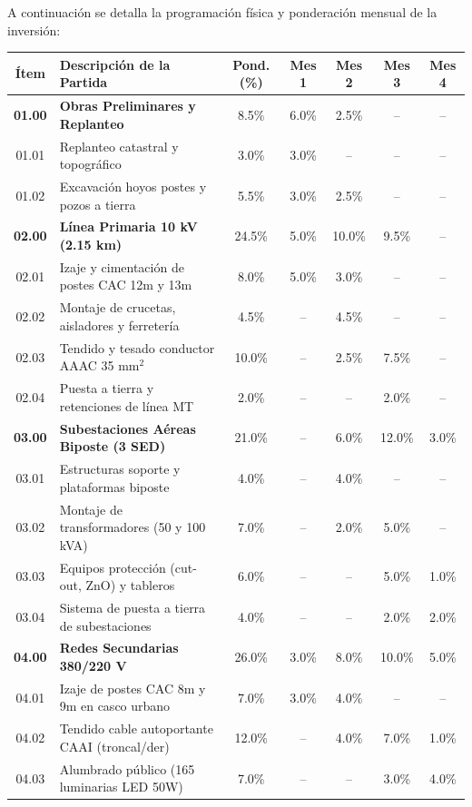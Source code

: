 A continuación se detalla la programación física y ponderación mensual de la inversión:

\begin{table}[H]
\centering
\small
\begin{tabular}{|c|l|c|c|c|c|c|}
\hline
\textbf{Ítem} & \textbf{Descripción de la Partida} & \textbf{Pond. (\%)} & \textbf{Mes 1} & \textbf{Mes 2} & \textbf{Mes 3} & \textbf{Mes 4} \\
\hline
\textbf{01.00} & \textbf{Obras Preliminares y Replanteo} & 8.5\% & 6.0\% & 2.5\% & -- & -- \\
01.01 & Replanteo catastral y topográfico & 3.0\% & 3.0\% & -- & -- & -- \\
01.02 & Excavación hoyos postes y pozos a tierra & 5.5\% & 3.0\% & 2.5\% & -- & -- \\
\hline
\textbf{02.00} & \textbf{Línea Primaria 10 kV (2.15 km)} & 24.5\% & 5.0\% & 10.0\% & 9.5\% & -- \\
02.01 & Izaje y cimentación de postes CAC 12m y 13m & 8.0\% & 5.0\% & 3.0\% & -- & -- \\
02.02 & Montaje de crucetas, aisladores y ferretería & 4.5\% & -- & 4.5\% & -- & -- \\
02.03 & Tendido y tesado conductor AAAC 35 mm$^2$ & 10.0\% & -- & 2.5\% & 7.5\% & -- \\
02.04 & Puesta a tierra y retenciones de línea MT & 2.0\% & -- & -- & 2.0\% & -- \\
\hline
\textbf{03.00} & \textbf{Subestaciones Aéreas Biposte (3 SED)} & 21.0\% & -- & 6.0\% & 12.0\% & 3.0\% \\
03.01 & Estructuras soporte y plataformas biposte & 4.0\% & -- & 4.0\% & -- & -- \\
03.02 & Montaje de transformadores (50 y 100 kVA) & 7.0\% & -- & 2.0\% & 5.0\% & -- \\
03.03 & Equipos protección (cut-out, ZnO) y tableros & 6.0\% & -- & -- & 5.0\% & 1.0\% \\
03.04 & Sistema de puesta a tierra de subestaciones & 4.0\% & -- & -- & 2.0\% & 2.0\% \\
\hline
\textbf{04.00} & \textbf{Redes Secundarias 380/220 V} & 26.0\% & 3.0\% & 8.0\% & 10.0\% & 5.0\% \\
04.01 & Izaje de postes CAC 8m y 9m en casco urbano & 7.0\% & 3.0\% & 4.0\% & -- & -- \\
04.02 & Tendido cable autoportante CAAI (troncal/der) & 12.0\% & -- & 4.0\% & 7.0\% & 1.0\% \\
04.03 & Alumbrado público (165 luminarias LED 50W) & 7.0\% & -- & -- & 3.0\% & 4.0\% \\

\end{tabular}
\end{table}
